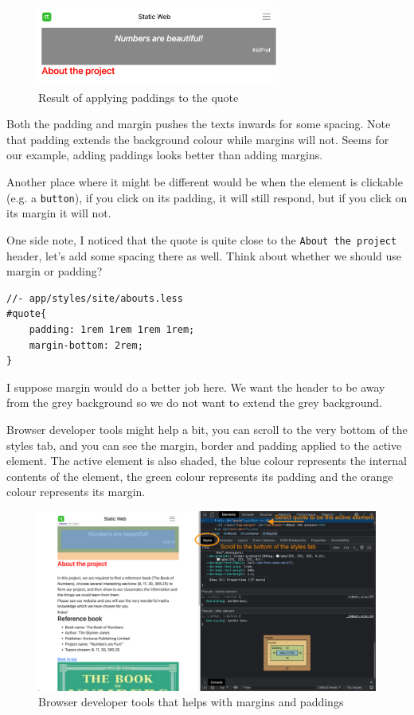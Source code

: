 \begin{figure}[H]
\centering
\includegraphics[width=8cm]{images/chn6-quote-padding.png}
\caption{Result of applying paddings to the quote}
\end{figure}

Both the padding and margin pushes the texts inwards for some spacing. Note that padding extends the background colour while margins will not. Seems for our example, adding paddings looks better than adding margins.

Another place where it might be different would be when the element is clickable (e.g. a \texttt{button}), if you click on its padding, it will still respond, but if you click on its margin it will not.
\vspace{6mm}

One side note, I noticed that the quote is quite close to the \texttt{About the project} header, let's add some spacing there as well. Think about whether we should use margin or padding?

\begin{lstlisting}[language=pug]
//- app/styles/site/abouts.less
#quote{
    padding: 1rem 1rem 1rem 1rem;
    margin-bottom: 2rem;
}
\end{lstlisting}

I suppose margin would do a better job here. We want the header to be away from the grey background so we do not want to extend the grey background. 
\vspace{6mm}

Browser developer tools might help a bit, you can scroll to the very bottom of the styles tab, and you can see the margin, border and padding applied to the active element. The active element is also shaded, the blue colour represents the internal contents of the element, the green colour represents its padding and the orange colour represents its margin.

\begin{figure}[h]
\centering
\includegraphics[width=15cm]{images/chn6-quote-chrome.png}
\caption{Browser developer tools that helps with margins and paddings}
\end{figure}

